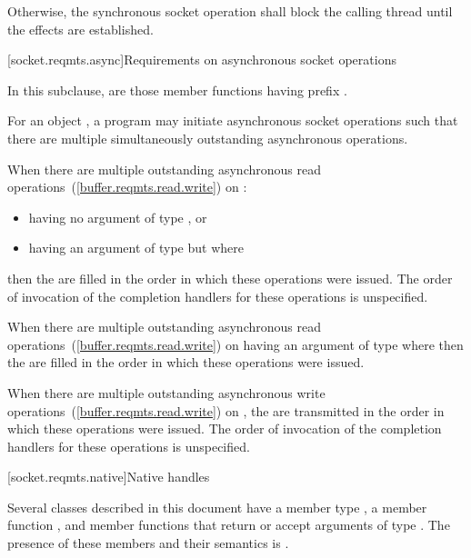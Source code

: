 \pnum
Otherwise, the synchronous socket operation shall block the calling thread until the effects are established.



[socket.reqmts.async]{Requirements on asynchronous socket operations}

\pnum
In this subclause,  are those member functions having prefix .

\pnum
For an object , a program may initiate asynchronous socket operations such that there are multiple simultaneously outstanding asynchronous operations.

\pnum
When there are multiple outstanding asynchronous read operations~(\ref{buffer.reqmts.read.write}) on :

\begin{itemize}
\item
having no argument  of type , or
\item
having an argument  of type  but where 
\end{itemize}

then the  are filled in the order in which these operations were issued. The order of invocation of the completion handlers for these operations is unspecified.

\pnum
When there are multiple outstanding asynchronous read operations~(\ref{buffer.reqmts.read.write}) on  having an argument  of type  where  then the  are filled in the order in which these operations were issued.

\pnum
When there are multiple outstanding asynchronous write operations~(\ref{buffer.reqmts.read.write}) on , the  are transmitted in the order in which these operations were issued. The order of invocation of the completion handlers for these operations is unspecified.



%
[socket.reqmts.native]{Native handles}

\pnum
Several classes described in this document have a member type , a member function , and member functions that return or accept arguments of type . The presence of these members and their semantics is
.

